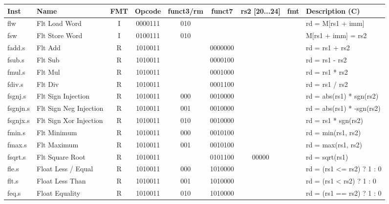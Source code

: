 \begin{center}
\begin{tabular}
{T | l | c | c | c | c | c | c | T } \hline
\rm Inst  & Name                  & FMT   & \rm Opcode & \rm funct3/rm & \rm funct7 & \rm rs2 [20...24] & \rm fmt & \rm Description (C)         \\ \hline
flw       & Flt Load Word         & I     & 0000111    & 010    &        &        & & rd = M[rs1 + imm]    \\
fsw       & Flt Store Word        & I     & 0100111    & 010    &        &        & & M[rs1 + imm] = rs2   \\
\hline
fadd.s    & Flt Add               & R     & 1010011    &        & 0000000 &        & & rd = rs1 + rs2       \\
fsub.s    & Flt Sub               & R     & 1010011    &        & 0000100 &        & & rd = rs1 - rs2       \\
fmul.s    & Flt Mul               & R     & 1010011    &        & 0001000 &        & & rd = rs1 * rs2       \\
fdiv.s    & Flt Div               & R     & 1010011    &        & 0001100 &        & & rd = rs1 / rs2       \\
fsgnj.s   & Flt Sign Injection    & R     & 1010011    & 000    & 0010000 &        & & rd = abs(rs1) * sgn(rs2) \\
fsgnjn.s  & Flt Sign Neg Injection& R     & 1010011    & 001    & 0010000 &        & & rd = abs(rs1) * -sgn(rs2) \\
fsgnjx.s  & Flt Sign Xor Injection& R     & 1010011    & 010    & 0010000 &        & & rd = rs1 * sgn(rs2)  \\
fmin.s    & Flt Minimum           & R     & 1010011    & 000    & 0010100 &        & & rd = min(rs1, rs2)   \\
fmax.s    & Flt Maximum           & R     & 1010011    & 001    & 0010100 &        & & rd = max(rs1, rs2)   \\
fsqrt.s   & Flt Square Root       & R     & 1010011    &        & 0101100 & 00000  & & rd = sqrt(rs1)       \\
\hline
fle.s     & Float Less / Equal    & R     & 1010011    & 000    & 1010000 &        & & rd = (rs1 <= rs2) ? 1 : 0\\
flt.s     & Float Less Than       & R     & 1010011    & 001    & 1010000 &        & & rd = (rs1 <  rs2) ? 1 : 0 \\
feq.s     & Float Equality        & R     & 1010011    & 010    & 1010000 &        & & rd = (rs1 == rs2) ? 1 : 0 \\
\hline

\end{tabular}
\end{center}
